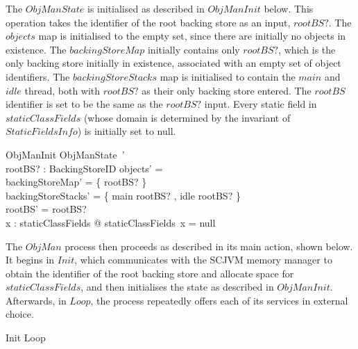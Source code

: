The $ObjManState$ is initialised as described in $ObjManInit$ below.
This operation takes the identifier of the root backing store as an
input, $rootBS?$.
The $objects$ map is initialised to the empty set, since there are
initially no objects in existence.
The $backingStoreMap$ initially contains only $rootBS?$, which is the
only backing store initially in existence, associated with an empty
set of object identifiers.
The $backingStoreStacks$ map is initialised to contain the $main$ and
$idle$ thread, both with $rootBS?$ as their only backing store
entered.
The $rootBS$ identifier is set to be the same as the $rootBS?$ input.
Every static field in $staticClassFields$ (whose domain is determined
by the invariant of $StaticFieldsInfo$) is initially set to null.
\begin{schema}{ObjManInit}
	ObjManState~' \\
	rootBS? : BackingStoreID
\where
	objects' = \emptyset \\
	backingStoreMap' = \{ rootBS? \mapsto \emptyset \} \\
	backingStoreStacks' = \{ main \mapsto \langle rootBS? \rangle, idle \mapsto \langle rootBS? \rangle \} \\
	rootBS' = rootBS? \\
	\forall x : \dom staticClassFields @ staticClassFields~x = null
\end{schema}

The $ObjMan$ process then proceeds as described in its main action,
shown below.
It begins in $Init$, which communicates with the SCJVM memory manager
to obtain the identifier of the root backing store and allocate space
for $staticClassFields$, and then initialises the state as described
in $ObjManInit$.
Afterwards, in $Loop$, the process repeatedly offers each of its
services in external choice.
\begin{circusaction}
  \circspot Init \circseq Loop
\end{circusaction}

